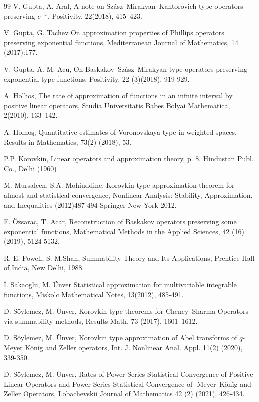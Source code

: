 \documentclass{amsart}
\theoremstyle{plain}
\numberwithin{equation}{section}
\begin{document}
\begin{thebibliography}{99}
V. Gupta, A. Aral, A note on
Sz\'{a}sz--Mirakyan--Kantorovich type operators preserving $e^{-x}$,
Positivity, 22(2018), 415--423.

V. Gupta, G. Tachev On approximation properties of
Phillips operators preserving exponential functions, Mediterranean Journal of
Mathematics, 14 (2017):177.

V. Gupta, A. M. Acu, On Baskakov--Sz\'{a}sz--Mirakyan-type
operators preserving exponential type functions, Positivity, 22 (3)(2018), 919-929.

A. Holhos, The rate of approximation of functions in an
infnite interval by positive linear operators, Studia Universitatis Babes
Bolyai Mathematica, 2(2010), 133--142.

A. Holho\c{s}, Quantitative estimates of Voronovskaya
type in weighted spaces. Results in Mathematics, 73(2) (2018), 53.



 P.P. Korovkin, Linear operators and approximation theory, p. 8. Hindustan Publ. Co., Delhi (1960)

M. Mursaleen, S.A. Mohiuddine, Korovkin type
approximation theorem for almost and statistical convergence, Nonlinear
Analysis: Stability, Approximation, and Inequalities (2012)487-494 Springer
New York 2012.


F. \"{O}zsarac, T. Acar, Reconstruction of Baskakov
operators preserving some exponential functions, Mathematical Methods in the
Applied Sciences, 42 (16) (2019), 5124-5132.

R. E. Powell, S. M.Shah,  Summability Theory and Its
Applications, Prentice-Hall of India, New Delhi, 1988.

\.{I}. Sakaoglu, M. \"{U}nver Statistical
approximation for multivariable integrable functions, Miskolc Mathematical
Notes, 13(2012), 485-491.

D. S\"{o}ylemez, M. \"{U}nver, Korovkin type theorems
for Cheney--Sharma Operators via summability methods, Results Math. 73 (2017), 1601--1612.

D. S\"{o}ylemez, M. \"{U}nver,  Korovkin type
approximation of Abel transforms of $q$-Meyer K\"{o}nig and Zeller operators,
Int. J. Nonlinear Anal. Appl. 11(2) (2020), 339-350.

D. S\"{o}ylemez, M. \"{U}nver, Rates of Power Series
Statistical Convergence of Positive Linear Operators and Power Series
Statistical Convergence of -Meyer--K\"{o}n\.{i}g and Zeller Operators,
Lobachevskii Journal of Mathematics 42 (2) (2021), 426-434.


\end{thebibliography}
\end{document}
